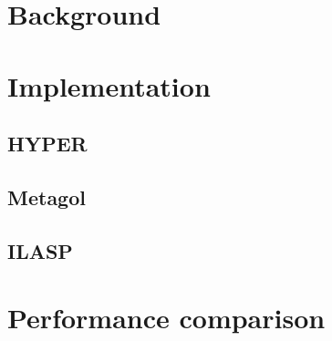 \documentclass[12pt]{article}
\begin{document}
\section{Background}\label{sec:back}
\section{Implementation}\label{sec:impl}
\subsection{HYPER}
\subsection{Metagol}
\subsection{ILASP}
\section{Performance comparison}
\end{document}
